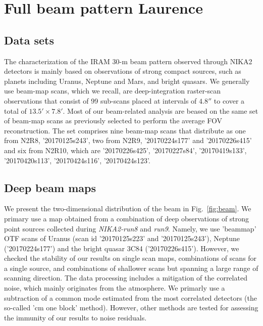 \section{Full beam pattern {\color{blue} Laurence}}
\label{se:fullbeam}

\subsection{Data sets}
\label{se:beammap_set}

The characterization of the IRAM 30-m beam pattern observed through NIKA2 detectors is mainly based on observations of strong compact sources, such as planets including Uranus, Neptune and Mars, and bright quasars. We generally use beam-map scans, which we recall, are deep-integration raster-scan observations that consist of 99 sub-scans placed at intervals of $4.8''$ to cover a total of $13.5' \times 7.8'$. Most of our beam-related analysis are beased on the same set of beam-map scans as previously selected to perform the average FOV reconstruction. The set comprises nine beam-map scans that distribute as one from N2R8, '20170125s243', two from N2R9, '20170224s177' and '20170226s415' and six from N2R10, which are '20170226s425', '20170227s84', '20170419s133', '20170420s113', '20170424s116', '20170424s123'. 


\subsection{Deep beam maps}
\label{se:beammaps}
We present the two-dimensional distribution of the beam in Fig.~\ref{fig:beam}. We primary use a map obtained from a combination of deep observations of strong point sources collected during \emph{NIKA2-run8} and \emph{run9}. Namely, we use 'beammap' OTF scans of Uranus (scan id '20170125s223' and '20170125s243'),  Neptune ('20170224s177') and the bright quasar 3C84 ('20170226s415'). However, we checked the stability of our results on single scan maps, combinations of scans for a single source, and combinations of shallower scans but spanning a large range of scanning direction. The data processing includes a mitigation of the correlated noise, which mainly originates from the atmosphere.  We primarly use a subtraction of a common mode estimated from the most correlated detectors (the so-called 'cm one block' method). However, other methods are tested for assessing the immunity of our results to noise residuals.

